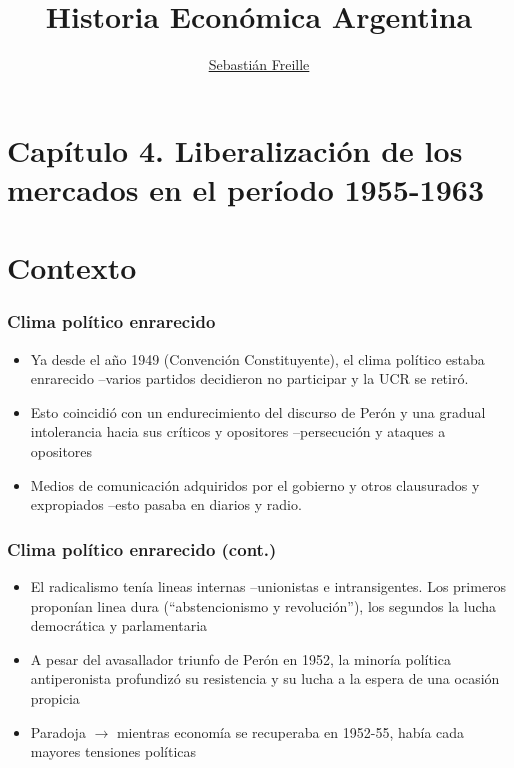 \documentclass[14pt,aspectratio=169]{beamer}
\title{Historia Económica Argentina}
\author{\underline{Sebastián Freille} \inst{1}}
\institute[shortinst]{\inst{1} IEF-UNC \\ UCC}
\date{}
\begin{document}
{
  \begin{frame}
    \titlepage
  \end{frame}
}

  
  \section{Capítulo 4. Liberalización de los mercados en el período 1955-1963}


  \section{Contexto}
  

 \begin{frame}\frametitle{Clima político enrarecido}
    \begin{itemize}\itemsep 10pt
      \item Ya desde el año 1949 (Convención Constituyente), el clima
        político estaba enrarecido --varios partidos decidieron no
        participar y la UCR se retiró.
        \item Esto coincidió con un endurecimiento del discurso de
          Perón y una gradual intolerancia hacia sus críticos y
          opositores --persecución y ataques a opositores
          \item Medios de comunicación adquiridos por el gobierno y
            otros clausurados y expropiados --esto pasaba en diarios y
            radio. 
                        \end{itemize}
               \end{frame}


               
 \begin{frame}\frametitle{Clima político enrarecido (cont.)}
    \begin{itemize}\itemsep 10pt
      \item El radicalismo tenía lineas internas --unionistas e
        intransigentes. Los primeros proponían linea dura
        (``abstencionismo y revolución''), los segundos la lucha
        democrática y parlamentaria
        \item A pesar del avasallador triunfo de Perón en 1952, la
          minoría política antiperonista profundizó su resistencia y
          su lucha a la espera de una ocasión propicia
          \item Paradoja $\longrightarrow$ mientras economía se
            recuperaba en 1952-55, había cada mayores tensiones políticas
                 \end{itemize}
               \end{frame}
\end{document}
